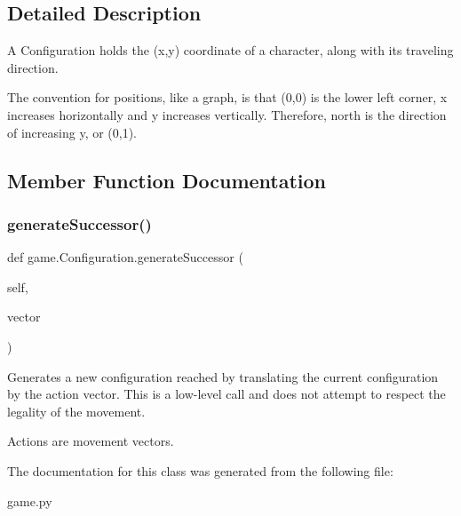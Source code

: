 \subsection{Detailed Description}
\begin{DoxyVerb}A Configuration holds the (x,y) coordinate of a character, along with its
traveling direction.

The convention for positions, like a graph, is that (0,0) is the lower left corner, x increases
horizontally and y increases vertically.  Therefore, north is the direction of increasing y, or (0,1).
\end{DoxyVerb}
 

\subsection{Member Function Documentation}
\mbox{\label{classgame_1_1_configuration_a282e5131bfdb055bdddde8df6d881c02}} 
\subsubsection{\texorpdfstring{generate\+Successor()}{generateSuccessor()}}
{\footnotesize\ttfamily def game.\+Configuration.\+generate\+Successor (\begin{DoxyParamCaption}\item[{}]{self,  }\item[{}]{vector }\end{DoxyParamCaption})}

\begin{DoxyVerb}Generates a new configuration reached by translating the current
configuration by the action vector.  This is a low-level call and does
not attempt to respect the legality of the movement.

Actions are movement vectors.
\end{DoxyVerb}
 

The documentation for this class was generated from the following file\+:\begin{DoxyCompactItemize}
\item 
game.\+py\end{DoxyCompactItemize}

